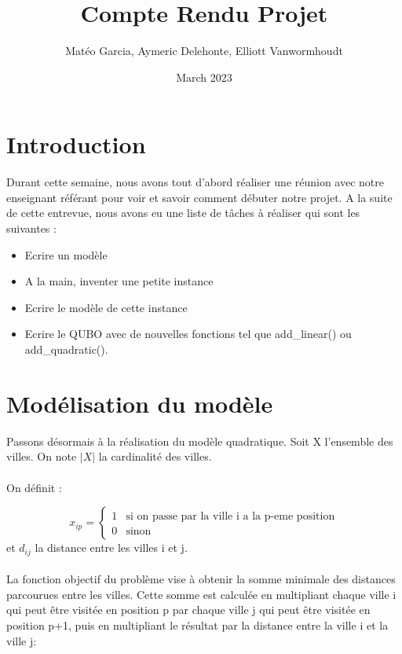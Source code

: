 \documentclass{article}
\title{Compte Rendu Projet}
\author{Matéo Garcia, Aymeric Delehonte, Elliott Vanwormhoudt}
\date{March 2023}
\begin{document}
        \maketitle

        \section{Introduction}\label{sec:introduction}
        Durant cette semaine, nous avons tout d'abord réaliser une réunion avec notre enseignant référant pour voir et savoir comment débuter notre projet. A la suite de cette entrevue, nous avons eu une liste de tâches à réaliser qui sont les suivantes :
        \begin{itemize}
            \item Ecrire un modèle
            \item A la main, inventer une petite instance
            \item Ecrire le modèle de cette instance
            \item Ecrire le QUBO avec de nouvelles fonctions tel que add\_linear() ou add\_quadratic().
        \end{itemize}



        \section{Modélisation du modèle}\label{sec:modelisation-du-modele}


        Passons désormais à la réalisation du modèle quadratique.
        Soit X l'ensemble des villes.
        On note $|X|$ la cardinalité des villes.\\\\
        On définit :

        \begin{equation*}
            x_{ip} =
            \begin{cases}
                1 & \text{si on passe par la ville i a la p-eme position}\\
                0 & \text{sinon}
            \end{cases}
        \end{equation*}
        et $d_{ij}$ la distance entre les villes i et j.\\\\
        La fonction objectif du problème vise à obtenir la somme minimale des distances parcourues entre les villes. Cette somme est calculée en multipliant chaque ville i qui peut être visitée en position p par chaque ville j qui peut être visitée en position p+1, puis en multipliant le résultat par la distance entre la ville i et la ville j:
\end{document}
